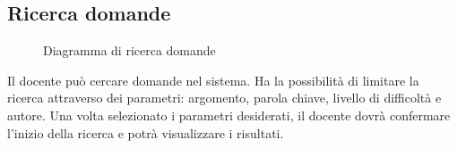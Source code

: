 \documentclass[a4paper, titlepage]{article}
\begin{document}
\newpage
\subsection{Ricerca domande}
\begin{figure}[H]
	\centering
	\noindent{}
	\caption{Diagramma di ricerca domande}
\end{figure}
Il docente può cercare domande nel sistema. Ha la possibilità di limitare la ricerca attraverso dei parametri: argomento, parola chiave, livello di difficoltà e autore. Una volta selezionato i parametri desiderati, il docente dovrà confermare l’inizio della ricerca e potrà visualizzare i risultati. 
\newpage
\end{document}
